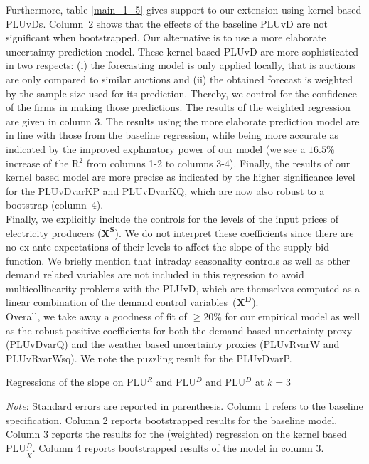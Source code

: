 Furthermore, table \ref{main_1_5} gives support to our extension using kernel based PLUvDs. Column~2 shows that the effects of the baseline PLUvD are not significant when bootstrapped. Our alternative is to use a more elaborate uncertainty prediction model.  These kernel based PLUvD are more sophisticated in two respects: (i) the forecasting model is only applied locally, that is auctions are only compared to similar auctions and (ii) the obtained forecast is weighted by the sample size used for its prediction. Thereby, we control for the confidence of the firms in making those predictions. The results of the weighted regression are given in column 3. The results using the more elaborate prediction model are in line with those from the baseline regression, while being more accurate as indicated by the improved explanatory power of our model (we see a $16.5\%$ increase of the R$^2$ from columns 1-2 to columns 3-4). Finally, the results of our kernel based model are more precise as indicated by the higher significance level for the PLUvDvarKP and PLUvDvarKQ, which are now also robust to a bootstrap (column~4).\\

Finally, we explicitly include the controls for the levels of the input prices of electricity producers ($\boldsymbol{X^S}$). We do not interpret these coefficients since there are no ex-ante expectations of their levels to affect the slope of the supply bid function. We briefly mention that intraday seasonality controls as well as other demand related variables are not included in this regression to avoid multicollinearity problems with the PLUvD, which are themselves computed as a linear combination of the demand control variables~($\boldsymbol{X^D}$). \\

Overall, we take away a goodness of fit of $\geq 20\%$ for our empirical model as well as the robust positive coefficients for both the demand based uncertainty proxy (PLUvDvarQ) and the weather based uncertainty proxies (PLUvRvarW and PLUvRvarWsq). We note the puzzling result for the PLUvDvarP. 

\begin{table}[!ht]
\vspace{-2.38cm}

\caption{\label{main_1_5} Regressions of the slope on PLU$^R$ and PLU$^{D}$ and PLU$^{D}$ at $k=3$}
\emph{Note}: Standard errors are reported in parenthesis. Column 1 refers to the baseline specification. Column 2 reports bootstrapped results for the baseline model. Column 3 reports the results for the (weighted) regression on the kernel based PLU$^D_{\tilde{X}}$. Column 4 reports bootstrapped results of the model in column 3. 
\end{table}
\pagestyle{empty}

